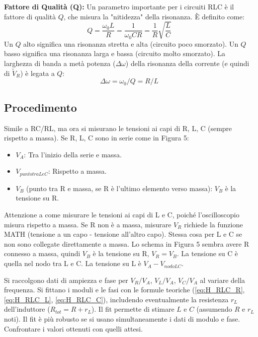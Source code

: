 \documentclass[a4paper, 11pt]{article}
\begin{document}
\textbf{Fattore di Qualità (Q):} Un parametro importante per i circuiti RLC è il fattore di qualità $Q$, che misura la "nitidezza" della risonanza. È definito come:
\begin{equation}
    Q = \frac{\omega_0 L}{R} = \frac{1}{\omega_0 C R} = \frac{1}{R} \sqrt{\frac{L}{C}}
\end{equation}
Un $Q$ alto significa una risonanza stretta e alta (circuito poco smorzato). Un $Q$ basso significa una risonanza larga e bassa (circuito molto smorzato).
La larghezza di banda a metà potenza ($\Delta \omega$) della risonanza della corrente (e quindi di $\tilde{V}_R$) è legata a $Q$:
\begin{equation}
    \Delta \omega = \omega_0 / Q = R / L
\end{equation}

\subsection{Procedimento}
Simile a RC/RL, ma ora si misurano le tensioni ai capi di R, L, C (sempre rispetto a massa). Se R, L, C sono in serie come in Figura 5:
\begin{itemize}
    \item $V_A$: Tra l'inizio della serie e massa.
    \item $V_{punto tra L e C}$: Rispetto a massa.
    \item $V_B$ (punto tra R e massa, se R è l'ultimo elemento verso massa): $V_B$ è la tensione su R.
\end{itemize}
Attenzione a come misurare le tensioni ai capi di L e C, poiché l'oscilloscopio misura rispetto a massa. Se R non è a massa, misurare $V_R$ richiede la funzione MATH (tensione a un capo - tensione all'altro capo). Stessa cosa per L e C se non sono collegate direttamente a massa.
Lo schema in Figura 5 sembra avere R connesso a massa, quindi $V_B$ è la tensione su R, $V_R = V_B$. La tensione su C è quella nel nodo tra L e C. La tensione su L è $V_A - V_{nodoLC}$.

Si raccolgono dati di ampiezza e fase per $V_R/V_A$, $V_L/V_A$, $V_C/V_A$ al variare della frequenza. Si fittano i moduli e le fasi con le formule teoriche (\ref{eq:H_RLC_R}, \ref{eq:H_RLC_L}, \ref{eq:H_RLC_C}), includendo eventualmente la resistenza $r_L$ dell'induttore ($R_{tot} = R + r_L$).
Il fit permette di stimare $L$ e $C$ (assumendo $R$ e $r_L$ noti). Il fit è più robusto se si usano simultaneamente i dati di modulo e fase. Confrontare i valori ottenuti con quelli attesi.
\end{document}
